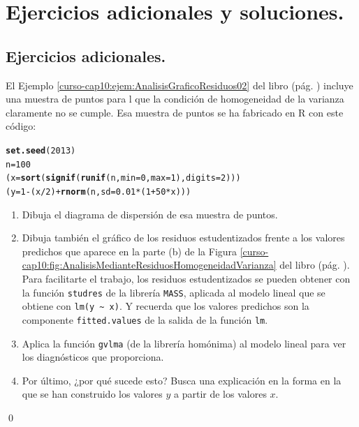 \documentclass[10pt,a4paper]{article}\usepackage[]{graphicx}\usepackage[]{color}
\makeatletter
\newcommand{\hlnum}[1]{\textcolor[rgb]{0.686,0.059,0.569}{#1}}%
\newcommand{\hlopt}[1]{\textcolor[rgb]{0,0,0}{#1}}%
\newcommand{\hlstd}[1]{\textcolor[rgb]{0.345,0.345,0.345}{#1}}%
\newcommand{\hlkwb}[1]{\textcolor[rgb]{0.69,0.353,0.396}{#1}}%
\newcommand{\hlkwc}[1]{\textcolor[rgb]{0.333,0.667,0.333}{#1}}%
\newcommand{\hlkwd}[1]{\textcolor[rgb]{0.737,0.353,0.396}{\textbf{#1}}}%
\newenvironment{kframe}{%
 \def\at@end@of@kframe{}%
 \ifinner\ifhmode%
  \def\at@end@of@kframe{\end{minipage}}%
  \begin{minipage}{\columnwidth}%
 \fi\fi%
 \def\FrameCommand##1{\hskip\@totalleftmargin \hskip-\fboxsep
 \colorbox{shadecolor}{##1}\hskip-\fboxsep
     \hskip-\linewidth \hskip-\@totalleftmargin \hskip\columnwidth}%
 \MakeFramed {\advance\hsize-\width
   \@totalleftmargin\z@ \linewidth\hsize
   \@setminipage}}%
 {\par\unskip\endMakeFramed%
 \at@end@of@kframe}
\newenvironment{knitrout}{}{} %
\makeatother
\begin{document}
\section{Ejercicios adicionales y soluciones.}
\label{tut10:sec:EjerciciosAdicionalesYSoluciones}

\subsection*{Ejercicios adicionales.}
\label{tut10:subsec:EjerciciosAdicionales}

\begin{ejercicio}
\label{tut10:ejercicio11}
El Ejemplo \ref{curso-cap10:ejem:AnalisisGraficoResiduos02} del libro (pág. \pageref{curso-cap10:ejem:AnalisisGraficoResiduos02}) incluye una muestra de puntos para l que la condición de homogeneidad de la varianza claramente no se cumple. Esa muestra de puntos se ha fabricado en R con este código:
\begin{knitrout}
\color{fgcolor}\begin{kframe}
\begin{alltt}
\hlkwd{set.seed}\hlstd{(}\hlnum{2013}\hlstd{)}
\hlstd{n}\hlkwb{=}\hlnum{100}
\hlstd{(x} \hlkwb{=} \hlkwd{sort}\hlstd{(}\hlkwd{signif}\hlstd{(}\hlkwd{runif}\hlstd{(n,} \hlkwc{min}\hlstd{=}\hlnum{0}\hlstd{,} \hlkwc{max}\hlstd{=}\hlnum{1} \hlstd{),} \hlkwc{digits}\hlstd{=}\hlnum{2}\hlstd{) )  )}
\hlstd{(y} \hlkwb{=} \hlnum{1} \hlopt{-} \hlstd{(x}\hlopt{/}\hlnum{2}\hlstd{)} \hlopt{+} \hlkwd{rnorm}\hlstd{(n,}\hlkwc{sd}\hlstd{=}\hlnum{0.01}\hlopt{*}\hlstd{(}\hlnum{1}\hlopt{+}\hlnum{50}\hlopt{*}\hlstd{x)))}
\end{alltt}
\end{kframe}
\end{knitrout}

\begin{enumerate}
  \item Dibuja el diagrama de dispersión de esa muestra de puntos.
  \item Dibuja también el gráfico de los residuos estudentizados frente a los valores predichos que aparece en la parte (b) de la Figura \ref{curso-cap10:fig:AnalisisMedianteResiduosHomogeneidadVarianza} del libro (pág. \pageref{curso-cap10:fig:AnalisisMedianteResiduosHomogeneidadVarianza}). Para facilitarte el trabajo, los residuos estudentizados se pueden obtener con la función {\tt studres} de la librería {\tt MASS}, aplicada al modelo lineal que se obtiene con \verb#lm(y ~ x)#. Y recuerda que los valores predichos son la componente {\tt fitted.values} de la salida de la función {\tt lm}.

  \item Aplica la función {\tt gvlma} (de la librería homónima) al modelo lineal para ver los diagnósticos que proporciona.

  \item Por último, ¿por qué sucede esto? Busca una explicación en la forma en la que se han construido los valores $y$ a partir de los valores $x$.
\end{enumerate}
\qed
\end{ejercicio}
\end{document}
